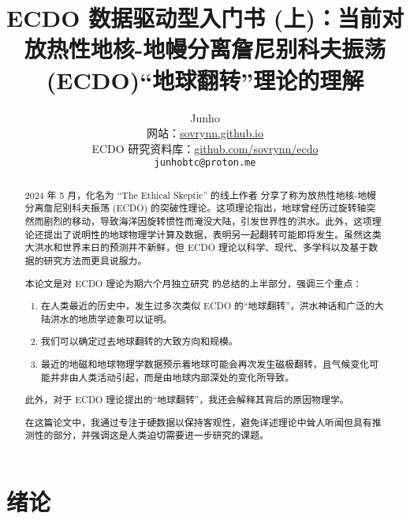 \documentclass[10pt,twocolumn,letterpaper]{article}
\begin{document}
\title{ECDO 数据驱动型入门书 (上)：当前对放热性地核-地幔分离詹尼别科夫振荡 (ECDO)“地球翻转”理论的理解}

\author{Junho\\
网站：\href{https://sovrynn.github.io}{sovrynn.github.io}\\
ECDO 研究资料库：\href{https://github.com/sovrynn/ecdo}{github.com/sovrynn/ecdo}\\
{\tt\small junhobtc@proton.me}
}

\maketitle

\begin{abstract}
2024 年 5 月，化名为 “The Ethical Skeptic” 的线上作者 \cite{0} 分享了称为放热性地核-地幔分离詹尼别科夫振荡 (ECDO) 的突破性理论\cite{1}。这项理论指出，地球曾经历过旋转轴突然而剧烈的移动，导致海洋因旋转惯性而淹没大陆，引发世界性的洪水。此外，这项理论还提出了说明性的地球物理学计算及数据，表明另一起翻转可能即将发生。虽然这类大洪水和世界末日的预测并不新鲜，但 ECDO 理论以科学、现代、多学科以及基于数据的研究方法而更具说服力。

本论文是对 ECDO 理论为期六个月独立研究 \cite{2,20} 的总结的上半部分，强调三个重点：

\begin{flushleft}
\begin{enumerate}
    \item 在人类最近的历史中，发生过多次类似 ECDO 的“地球翻转”，洪水神话和广泛的大陆洪水的地质学迹象可以证明。
    \item 我们可以确定过去地球翻转的大致方向和规模。
    \item 最近的地磁和地球物理学数据预示着地球可能会再次发生磁极翻转，且气候变化可能并非由人类活动引起，而是由地球内部深处的变化所导致。
\end{enumerate}
\end{flushleft}

此外，对于 ECDO 理论提出的“地球翻转”，我还会解释其背后的原因物理学。

在这篇论文中，我通过专注于硬数据以保持客观性，避免详述理论中耸人听闻但具有推测性的部分，并强调这是人类迫切需要进一步研究的课题。
\end{abstract}

\section{绪论}
\end{document}

